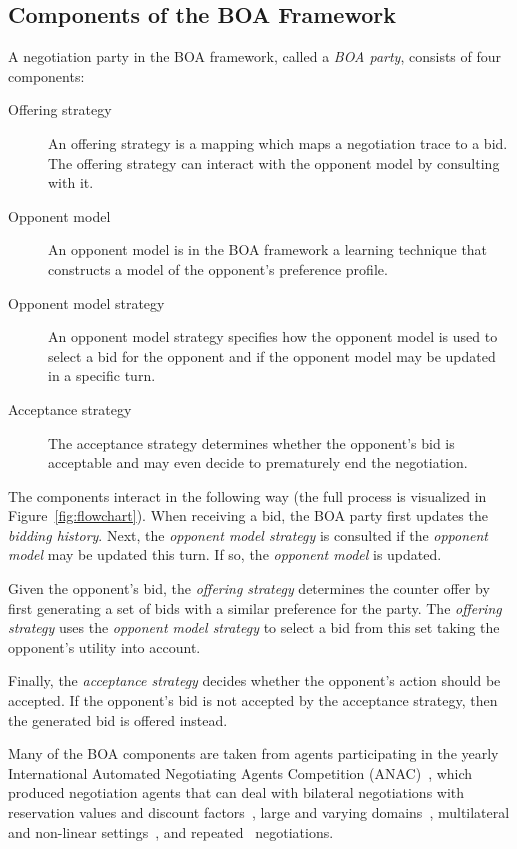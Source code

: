 \documentclass[]{llncs}
\begin{document}
\subsection{Components of the BOA Framework}
A negotiation party in the BOA framework, called a \textit{BOA party}, consists of four components:
\begin{description}
  \item[Offering strategy] An offering strategy is a mapping which maps a negotiation trace to a bid. The offering strategy can interact with the opponent model by consulting with it.%

  \item[Opponent model] An opponent model is in the BOA framework a learning technique that constructs a model of the opponent's preference profile.%
  \item[Opponent model strategy] An opponent model strategy specifies how the opponent model is used to select a bid for the opponent and if the opponent model may be updated in a specific turn.
  \item[Acceptance strategy] The acceptance strategy determines whether the opponent's bid is acceptable and may even decide to prematurely end the negotiation.
\end{description}
The components interact in the following way (the full process is visualized in Figure~\ref{fig:flowchart}). When receiving a bid, the BOA party first  updates the \textit{bidding history}. Next, the \textit{opponent model strategy} is consulted if the \textit{opponent model} may be updated this turn. If so, the \textit{opponent model} is updated.

Given the opponent's bid, the \textit{offering strategy} determines the counter offer by first generating a set of bids with a similar preference for the party. The \textit{offering strategy} uses the \textit{opponent model strategy} to select a bid from this set taking the opponent's utility into account.

Finally, the \textit{acceptance strategy} decides whether the opponent's action should be accepted. If the opponent's bid is not accepted by the acceptance strategy, then the generated bid is offered instead.

Many of the BOA components are taken from agents participating in the yearly International Automated Negotiating Agents Competition (ANAC)~\cite{BaarslagANAC2010-2015}, which produced negotiation agents that can deal with bilateral negotiations with reservation values and discount factors~\cite{Baarslag10ANAC,Baarslag12ANAC2011,ANAC2012}, large and varying domains~\cite{ANAC2013,ANAC2014}, multilateral and non-linear settings~\cite{ANAC2015}, and repeated~\cite{ANAC2019} negotiations.
\end{document}
